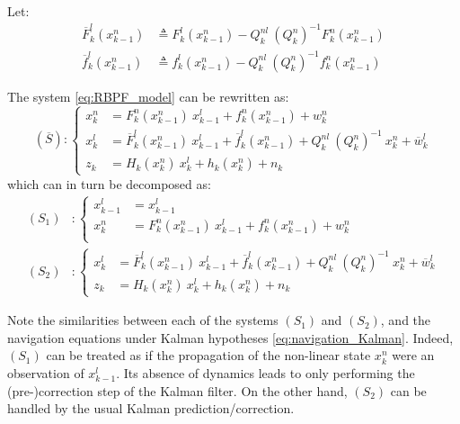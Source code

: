 Let:\begin{align}
	\overline{F}_k^l(x_{k-1}^n)&\triangleq F_k^l(x_{k-1}^n)-Q_k^{nl}\:(Q_k^n)^{-1}F_k^n(x_{k-1}^n)\\
	\overline{f}_k^l(x_{k-1}^n)&\triangleq f_k^l(x_{k-1}^n)-Q_k^{nl}\:(Q_k^n)^{-1}f_k^n(x_{k-1}^n)
\end{align}

The system \eqref{eq:RBPF_model} can be rewritten as:
\begin{equation}
	\left(\overline{S}\right):\left\{\begin{aligned}
	x_k^n&=F_k^n\left(x_{k-1}^n\right)\:x_{k-1}^l+f_k^n\left(x_{k-1}^n\right)+w_k^n\\
	x_k^l&=\overline{F}_k^l\left(x_{k-1}^n\right)\:x_{k-1}^l+\overline{f}_k^l\left(x_{k-1}^n\right)+Q_k^{nl}\:(Q_k^n)^{-1}\:x_k^n+\overline{w}_k^l\\
	z_k&=H_k\left(x_k^n\right)\:x_k^l+h_k\left(x_k^n\right)+n_k
	\end{aligned}\right.
\end{equation}
which can in turn be decomposed as:
\begin{equation}
	\begin{aligned}
	(S_1)&:\left\{\begin{aligned}
	x_{k-1}^l&=x_{k-1}^l\\
	x_k^n&=F_k^n\left(x_{k-1}^n\right)\:x_{k-1}^l+f_k^n\left(x_{k-1}^n\right)+w_k^n\\
	\end{aligned}\right.\\
	(S_2)&:\left\{\begin{aligned}
	x_k^l&=\overline{F}_k^l\left(x_{k-1}^n\right)\:x_{k-1}^l+\overline{f}_k^l\left(x_{k-1}^n\right)+Q_k^{nl}\:(Q_k^n)^{-1}\:x_k^n+\overline{w}_k^l\\
	z_k&=H_k\left(x_k^n\right)\:x_k^l+h_k\left(x_k^n\right)+n_k
	\end{aligned}\right.
	\end{aligned}
\end{equation}

Note the similarities between each of the systems $(S_1)$ and $(S_2)$, and the navigation equations under Kalman hypotheses \eqref{eq:navigation_Kalman}. Indeed, $(S_1)$ can be treated as if the propagation of the non-linear state $x_k^n$ were an observation of $x_{k-1}^l$. Its absence of dynamics leads to only performing the (pre-)correction step of the Kalman filter. On the other hand, $(S_2)$ can be handled by the usual Kalman prediction/correction.

